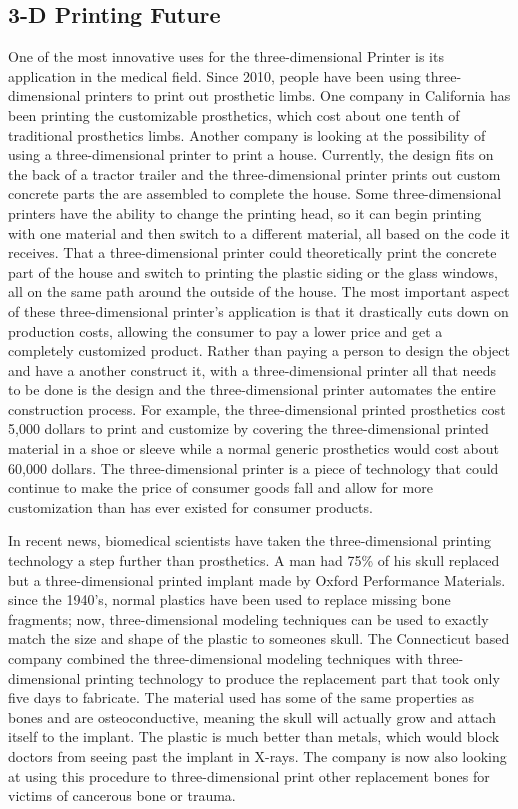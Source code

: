 \documentclass[pdftex,10.5pt]{report}
\begin{document}
\subsection{3-D Printing Future}
One of the most innovative uses for the three-dimensional Printer is its application in the medical field. Since 2010, people have been using three-dimensional printers to print out prosthetic limbs. One company in California has been printing the customizable prosthetics, which cost about one tenth of traditional prosthetics limbs. Another company is looking at the possibility of using a three-dimensional printer to print a house. Currently, the design fits on the back of a tractor trailer and the three-dimensional printer prints out custom concrete parts the are assembled to complete the house. Some three-dimensional printers have the ability to change the printing head, so it can begin printing with one material and then switch to a different material, all based on the code it receives. That a three-dimensional printer could theoretically print the concrete part of the house and switch to printing the plastic siding or the glass windows, all on the same path around the outside of the house. The most important aspect of these three-dimensional printer's application is that it drastically cuts down on production costs, allowing the consumer to pay a lower price and get a completely customized product. Rather than paying a person to design the object and have a another construct it, with a three-dimensional printer all that needs to be done is the design and the three-dimensional printer automates the entire construction process. For example, the three-dimensional printed prosthetics cost 5,000 dollars to print and customize by covering the three-dimensional printed material in a shoe or sleeve while a normal generic prosthetics would cost about 60,000 dollars.\cite{cite5} The three-dimensional printer is a piece of technology that could continue to make the price of consumer goods fall and allow for more customization than has ever existed for consumer products.

In recent news, biomedical scientists have taken the three-dimensional printing technology a step further than prosthetics. A man had 75\% of his skull replaced but a three-dimensional printed implant made by Oxford Performance Materials. since the 1940's, normal plastics have been used  to replace missing bone fragments; now, three-dimensional modeling techniques can be used to exactly match the size and shape of the plastic to someones skull. The Connecticut based company combined the three-dimensional modeling techniques with three-dimensional printing technology to produce the replacement part that took only five days to fabricate.\cite{cite9} The material used has some of the same properties as bones and are osteoconductive, meaning the skull will actually grow and attach itself to the implant. The plastic is much better than metals, which would block doctors from seeing past the implant in X-rays. The company is now also looking at using this procedure to three-dimensional print other replacement bones for victims of cancerous bone or trauma.
\end{document}
